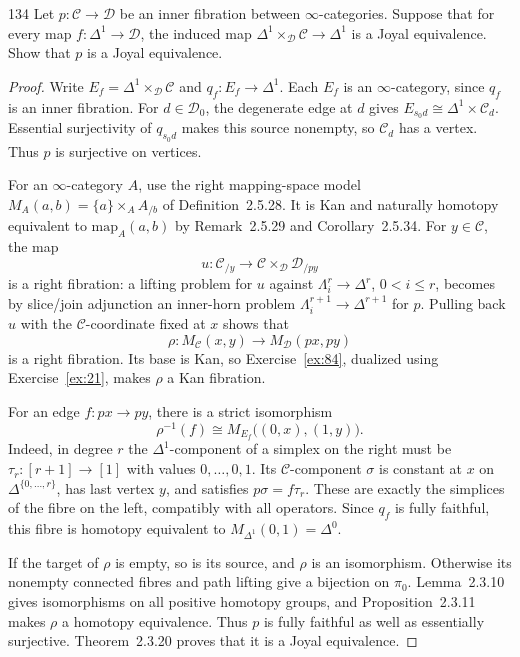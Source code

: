 \begin{exercise}{134}
Let $p\colon\mathcal C\to\mathcal D$ be an inner fibration between $\infty$-categories. Suppose that for
every map $f\colon\Delta^1\to\mathcal D$, the induced map $\Delta^1\times_{\mathcal D}\mathcal C\to\Delta^1$ is a Joyal equivalence. Show that
$p$ is a Joyal equivalence.

\begin{proof}
Write $E_f=\Delta^1\times_{\mathcal D}\mathcal C$ and $q_f\colon E_f\to\Delta^1$.
Each $E_f$ is an $\infty$-category, since $q_f$ is an inner fibration.
For $d\in\mathcal D_0$, the degenerate edge at $d$ gives
$E_{s_0d}\cong\Delta^1\times\mathcal C_d$.
Essential surjectivity of $q_{s_0d}$ makes this source nonempty, so
$\mathcal C_d$ has a vertex. Thus $p$ is surjective on vertices.

For an $\infty$-category $A$, use the right mapping-space model
$M_A(a,b)=\{a\}\times_A A_{/b}$ of Definition~2.5.28.
It is Kan and naturally homotopy equivalent to $\mathrm{map}_A(a,b)$
by Remark~2.5.29 and Corollary~2.5.34.
For $y\in\mathcal C$, the map
\[
 u\colon\mathcal C_{/y}\longrightarrow
     \mathcal C\times_{\mathcal D}\mathcal D_{/py}
\]
is a right fibration: a lifting problem for $u$ against
$\Lambda_i^r\to\Delta^r$, $0<i\le r$, becomes by slice/join adjunction
an inner-horn problem $\Lambda_i^{r+1}\to\Delta^{r+1}$ for $p$.
Pulling back $u$ with the $\mathcal C$-coordinate fixed at $x$ shows that
\[
 \rho\colon M_{\mathcal C}(x,y)\longrightarrow M_{\mathcal D}(px,py)
\]
is a right fibration. Its base is Kan, so Exercise~\ref{ex:84}, dualized
using Exercise~\ref{ex:21}, makes $\rho$ a Kan fibration.

For an edge $f\colon px\to py$, there is a strict isomorphism
\[
 \rho^{-1}(f)\cong M_{E_f}\bigl((0,x),(1,y)\bigr).
\]
Indeed, in degree $r$ the $\Delta^1$-component of a simplex on the right
must be $\tau_r\colon[r+1]\to[1]$ with values $0,\ldots,0,1$.
Its $\mathcal C$-component $\sigma$ is constant at $x$ on $\Delta^{\{0,\ldots,r\}}$,
has last vertex $y$, and satisfies $p\sigma=f\tau_r$.
These are exactly the simplices of the fibre on the left, compatibly
with all operators.
Since $q_f$ is fully faithful, this fibre is homotopy equivalent to
$M_{\Delta^1}(0,1)=\Delta^0$.

If the target of $\rho$ is empty, so is its source, and $\rho$ is an
isomorphism. Otherwise its nonempty connected fibres and path lifting
give a bijection on $\pi_0$.
Lemma~2.3.10 gives isomorphisms on all positive homotopy groups, and
Proposition~2.3.11 makes $\rho$ a homotopy equivalence.
Thus $p$ is fully faithful as well as essentially surjective.
Theorem~2.3.20 proves that it is a Joyal equivalence.
\end{proof}
\end{exercise}
